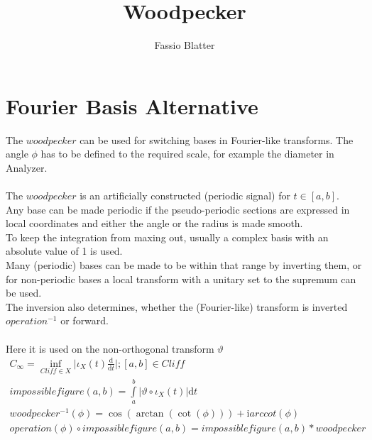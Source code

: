 \documentclass{report}
\begin{document}
\title{Woodpecker}
\author{Fassio Blatter}
\maketitle

\chapter{Fourier Basis Alternative}
The $woodpecker$ can be used for switching bases in Fourier-like transforms. The angle $\phi$ has to be defined to the required scale, for example the diameter in Analyzer.\\\\
The $woodpecker$ is an artificially constructed (periodic signal) for $t \in [a,b]$.\\
Any base can be made periodic if the pseudo-periodic sections are expressed in local coordinates and either the angle or the radius is made smooth.\\
To keep the integration from maxing out, usually a complex basis with an absolute value of 1 is used.\\
Many (periodic) bases can be made to be within that range by inverting them, or for non-periodic bases a local transform with a unitary set to the supremum can be used.\\
The inversion also determines, whether the (Fourier-like) transform is inverted $operation^{-1}$ or forward.\\\\
Here it is used on the non-orthogonal transform $\vartheta$
\begin{align}
C_{\infty}=\inf_{Cliff \in X} \lvert \iota_{X}(t) \frac{\mathrm{d}}{\mathrm{d}t} \rvert; [a,b] \in Cliff\\
impossiblefigure(a,b)=\int \limits _{a}^{b} \lvert\vartheta \circ \iota_{X}(t)\rvert\mathrm{d}t\\
woodpecker^{-1}(\phi)=\cos(\arctan(\cot(\phi))) + \mathrm{i} arccot(\phi)\\
operation(\phi) \circ impossiblefigure(a,b)=impossiblefigure(a,b)*woodpecker
\end{align}


\iffalse
\printbibliography
\fi
{}

\end{document}
